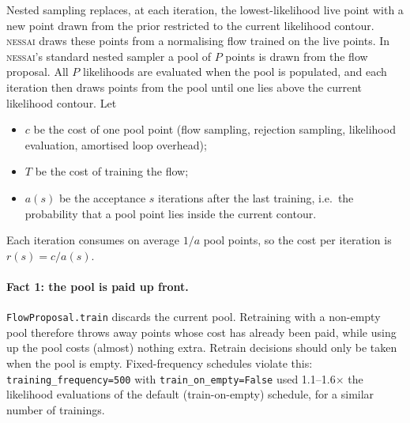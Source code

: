\documentclass[11pt,a4paper]{article}
\newcommand{\code}[1]{\texttt{#1}}
\begin{document}
Nested sampling \citep{Skilling2006} replaces, at each iteration, the
lowest-likelihood live point with a new point drawn from the prior restricted
to the current likelihood contour. \textsc{nessai}
\citep{Williams2021,Williams2023} draws these points from a normalising flow
trained on the live points. In \textsc{nessai}'s standard nested sampler a pool of $P$ points is drawn
from the flow proposal. All $P$ likelihoods are evaluated when the pool is
populated, and each iteration then draws points from the pool until one lies
above the current likelihood contour. Let
\begin{itemize}
  \item $c$ be the cost of one pool point (flow sampling, rejection sampling,
        likelihood evaluation, amortised loop overhead);
  \item $T$ be the cost of training the flow;
  \item $a(s)$ be the acceptance $s$ iterations after the last training, i.e.\
        the probability that a pool point lies inside the current contour.
\end{itemize}
Each iteration consumes on average $1/a$ pool points, so the cost per
iteration is $r(s)=c/a(s)$.

\paragraph{Fact 1: the pool is paid up front.} \code{FlowProposal.train}
discards the current pool. Retraining with a non-empty pool therefore throws
away points whose cost has already been paid, while using up the pool costs
(almost) nothing extra. Retrain decisions should only be taken when the pool
is empty. Fixed-frequency schedules violate this: \code{training\_frequency=500}
with \code{train\_on\_empty=False} used 1.1--1.6$\times$ the likelihood
evaluations of the default (train-on-empty) schedule, for a similar number
of trainings.
\end{document}
